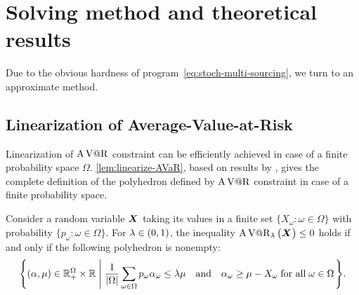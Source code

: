 \section{Solving method and theoretical results}
\label{sec:multi-sourcing:stochastic:solving-method}


Due to the obvious hardness of program~\eqref{eq:stoch-multi-sourcing}, we turn to an approximate method.


\subsection{Linearization of Average-Value-at-Risk}
\label{sec:multi-sourcing:stochastic:avar-linearization}


Linearization of $\operatorname{A\operatorname{V@R}}$ constraint can be efficiently achieved in case of a finite probability space $\Omega$.
\cref{lem:linearize-AVaR}, based on results by \citet{Rockafellar2000}, gives the complete definition of the polyhedron defined by $\operatorname{A\operatorname{V@R}}$ constraint in case of a finite probability space.


\begin{lem}\label{lem:linearize-AVaR}
Consider a random variable $\va X$ taking its values in a finite set $\{X_{\omega}\colon\omega\in\Omega\}$ with probability $\{p_{\omega}\colon\omega\in\Omega\}$.
For $\lambda\in\bracket{0,1}$, the inequality $\AVaR_{\lambda}\bracket{\va X} \le 0$ holds if and only if the following polyhedron is nonempty:
$$
\left\{
\bracket{\alpha,\mu}\in\RR_+^{\Omega}\times\RR
\;\left|\;
\frac{1}{\card{\Omega}}\sum_{\omega\in\Omega}p_{\omega}\alpha_{\omega}\leq \lambda \mu
\quad\mbox{\textup{and}}\quad
\alpha_{\omega}\geq \mu-X_{\omega}\;
\mbox{\textup{for all}}\;\omega\in\Omega
\right.
\right\}.
$$
\end{lem}


